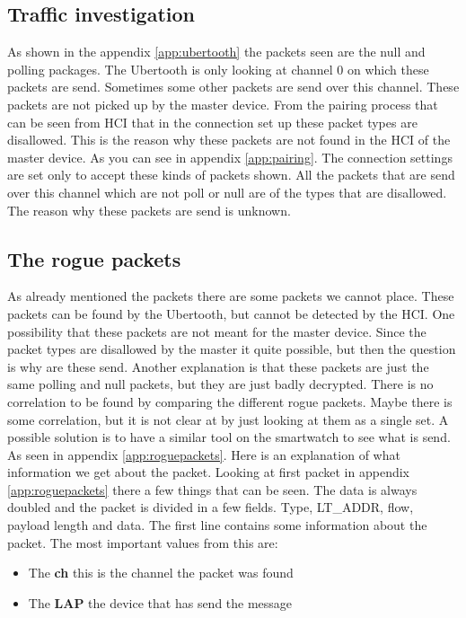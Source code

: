 \subsection{Traffic investigation}
As shown in the appendix \ref{app:ubertooth} the packets seen are the null and polling packages. The Ubertooth is only looking at channel 0 on which these packets are send. Sometimes some other packets are send over this channel. These packets are not picked up by the master device. From the pairing process that can be seen from HCI that in the connection set up these packet types are disallowed. This is the reason why these packets are not found in the HCI of the master device. As you can see in appendix \ref{app:pairing}. The connection settings are set only to accept these kinds of packets shown. All the packets that are send over this channel which are not poll or null are of the types that are disallowed. \pend
The reason why these packets are send is unknown.
\subsection{The rogue packets}
As already mentioned the packets there are some packets we cannot place. These packets can be found by the Ubertooth, but cannot be detected by the HCI. One possibility that these packets are not meant for the master device. Since the packet types are disallowed by the master it quite possible, but then the question is why are these send. Another explanation is that these packets are just the same polling and null packets, but they are just badly decrypted. There is no correlation to be found by comparing the different rogue packets. Maybe there is some correlation, but it is not clear at by just looking at them as a single set. A possible solution is to have a similar tool on the smartwatch to see what is send. As seen in appendix \ref{app:roguepackets}. Here is an explanation of what information we get about the packet.
Looking at first packet in appendix \ref{app:roguepackets} there a few things that can be seen. The data is always doubled and the packet is divided in a few fields. Type, LT\_ADDR, flow, payload length and data. The first line contains some information about the packet. The most important values from this are:
\begin{itemize} 
\item The \textbf{ch} this is the channel the packet was found 
\item The \textbf{LAP} the device that has send the message
\end{itemize}
